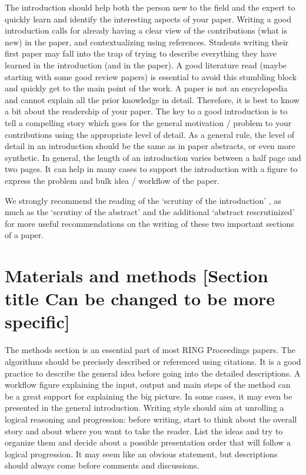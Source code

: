 \documentclass[final]{ring}
\begin{document}
The introduction should help both the person new to the field and the expert to quickly learn and identify the interesting aspects of your paper. Writing a good introduction calls for already having a clear view of the contributions (what is new) in the paper, and contextualizing using references. Students writing their first paper may fall into the trap of trying to describe everything they have learned in the introduction (and in the paper). A good literature read (maybe starting with some good review papers) is essential to avoid this stumbling block and quickly get to the main point of the work. A paper is not an encyclopedia and cannot explain all the prior knowledge in detail. Therefore, it is best to know a bit about the readership of your paper. The key to a good introduction is to tell a compelling story which goes for the general motivation / problem to your contributions using the appropriate level of detail. As a general rule, the level of detail in an introduction should be the same as in paper abstracts, or even more synthetic. In general, the length of an introduction varies between a half page and two pages. It can help in many cases to support the introduction with a figure to express the problem and bulk idea / workflow of the paper. 

We strongly recommend the reading of the `scrutiny of the introduction' \citep{Claerbout1988S}, as much as the `scrutiny of the abstract' \citep{Landes1966BAAPG} and the additional `abstract rescrutinized' \citep{Lowman1998G} for more useful recommendations on the writing of these two important sections of a paper. 

\section{Materials and methods [Section title Can be changed to be more specific]}
\label{sec:Method}

The methods section is an essential part of most RING Proceedings papers. The algorithms should be precisely described or referenced using citations. It is a good practice to describe the general idea before going into the detailed descriptions. A workflow figure explaining the input, output and main steps of the method can be a great support for explaining the big picture. In some cases, it may even be presented in the general introduction. 
Writing style should aim at unrolling a logical reasoning and progression: before writing, start to think about the overall story and about where you want to take the reader. List the ideas and try to organize them and decide about a possible presentation order that will follow a logical progression. It may seem like an obvious statement, but descriptions should always come before comments and discussions. 
\end{document}
